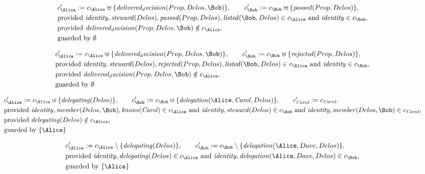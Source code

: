 \begin{align*}
&
c'_
{
\Alice
}
 := 
c_
{
\Alice
}
 \uplus 
\{
\mathit{
delivered_decision
}
(
Prop
,
Delos
,
\Bob
)
\}
, \qquad 
c'_
{
\Bob
}
 := 
c_
{
\Bob
}
 \uplus 
\{
\mathit{
passed
}
(
Prop
,
Delos
)
\}
,\\
&
\text{provided } 
\mathit{
identity
}
,
\mathit{
steward
}
(
Delos
)
,
\mathit{
passed
}
(
Prop
,
Delos
)
,
\mathit{
listed
}
(
\Bob
,
Delos
)
 \in c_
{
\Alice
}
 \text{ and } 
\mathit{
identity
}
 \in c_
{
\Bob
}
,\\
&
\text{provided } 
\mathit{
delivered_decision
}
(
Prop
,
Delos
,
\Bob
)
 \notin c_
{
\Alice
}
,\\
&
\text{guarded by } \emptyset
\end{align*}

\begin{align*}
&
c'_
{
\Alice
}
 := 
c_
{
\Alice
}
 \uplus 
\{
\mathit{
delivered_decision
}
(
Prop
,
Delos
,
\Bob
)
\}
, \qquad 
c'_
{
\Bob
}
 := 
c_
{
\Bob
}
 \uplus 
\{
\mathit{
rejected
}
(
Prop
,
Delos
)
\}
,\\
&
\text{provided } 
\mathit{
identity
}
,
\mathit{
steward
}
(
Delos
)
,
\mathit{
rejected
}
(
Prop
,
Delos
)
,
\mathit{
listed
}
(
\Bob
,
Delos
)
 \in c_
{
\Alice
}
 \text{ and } 
\mathit{
identity
}
 \in c_
{
\Bob
}
,\\
&
\text{provided } 
\mathit{
delivered_decision
}
(
Prop
,
Delos
,
\Bob
)
 \notin c_
{
\Alice
}
,\\
&
\text{guarded by } \emptyset
\end{align*}

\begin{align*}
&
c'_
{
\Alice
}
 := 
c_
{
\Alice
}
 \uplus 
\{
\mathit{
delegating
}
(
Delos
)
\}
, \qquad 
c'_
{
\Bob
}
 := 
c_
{
\Bob
}
 \uplus 
\{
\mathit{
delegation
}
(
\Alice
,
\mathit{Carol}
,
Delos
)
\}
, \qquad 
c'_
{
\mathit{Carol}
}
 := 
c_
{
\mathit{Carol}
}
,\\
&
\text{provided } 
\mathit{
identity
}
,
\mathit{
member
}
(
Delos
,
\Bob
)
,
\mathit{
knows
}
(
\mathit{Carol}
)
 \in c_
{
\Alice
}
 \text{ and } 
\mathit{
identity
}
,
\mathit{
steward
}
(
Delos
)
 \in c_
{
\Bob
}
 \text{ and } 
\mathit{
identity
}
,
\mathit{
member
}
(
Delos
,
\Bob
)
 \in c_
{
\mathit{Carol}
}
,\\
&
\text{provided } 
\mathit{
delegating
}
(
Delos
)
 \notin c_
{
\Alice
}
,\\
&
\text{guarded by } \{
\Alice
\}
\end{align*}

\begin{align*}
&
c'_
{
\Alice
}
 := 
c_
{
\Alice
}
 \setminus 
\{
\mathit{
delegating
}
(
Delos
)
\}
, \qquad 
c'_
{
\Bob
}
 := 
c_
{
\Bob
}
 \setminus 
\{
\mathit{
delegation
}
(
\Alice
,
Dave
,
Delos
)
\}
,\\
&
\text{provided } 
\mathit{
identity
}
,
\mathit{
delegating
}
(
Delos
)
 \in c_
{
\Alice
}
 \text{ and } 
\mathit{
identity
}
,
\mathit{
delegation
}
(
\Alice
,
Dave
,
Delos
)
 \in c_
{
\Bob
}
,\\
&
\text{guarded by } \{
\Alice
\}
\end{align*}
